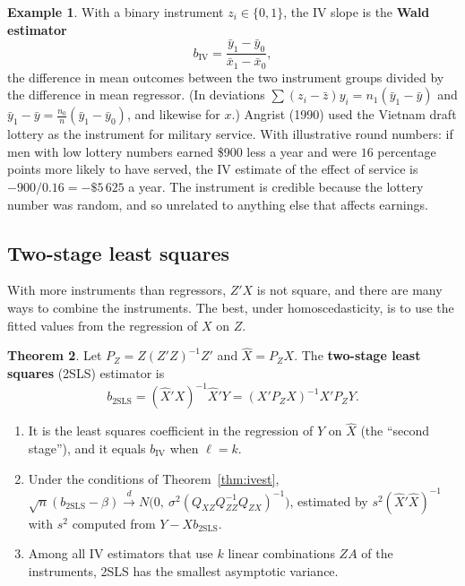 \documentclass[11pt,a4paper]{article}
\numberwithin{equation}{section}
\theoremstyle{definition}
\newtheorem{thm}{Theorem}[subsection]
\newtheorem{exa}[thm]{Example}
\begin{document}
\begin{exa}
\label{ex:wald}
With a binary instrument $z_i \in \{0, 1\}$, the IV slope is the \textbf{Wald estimator}
\[
b_{\text{IV}} = \frac{\bar y_1 - \bar y_0}{\bar x_1 - \bar x_0},
\]
the difference in mean outcomes between the two instrument groups divided by the difference in mean regressor. (In deviations
$\sum(z_i - \bar z)y_i = n_1(\bar y_1 - \bar y)$ and $\bar y_1 - \bar y = \frac{n_0}{n}(\bar y_1 - \bar y_0)$, and likewise for $x$.) Angrist (1990) used the Vietnam draft lottery as
the instrument for military service. With illustrative round numbers: if men with low lottery numbers earned \$900 less a year and were $16$ percentage points more likely to have
served, the IV estimate of the effect of service is $-900/0.16 = -\$5\,625$ a year. The instrument is credible because the lottery number was random,
and so unrelated to anything else that affects earnings.
\end{exa}

\subsection{Two-stage least squares}
\label{ssec:tsls}

With more instruments than regressors, $Z'X$ is not square, and there are many ways to combine the instruments. The best, under
homoscedasticity, is to use the fitted values from the regression of $X$ on $Z$.

\begin{thm}
\label{thm:tsls}
Let $P_Z = Z(Z'Z)^{-1}Z'$ and $\hat X = P_ZX$. The \textbf{two-stage least squares} (2SLS) estimator is
\[
b_{\text{2SLS}} = (\hat X'X)^{-1}\hat X'Y = (X'P_ZX)^{-1}X'P_ZY .
\]
\begin{enumerate}[label=(\roman*)]
\item It is the least squares coefficient in the regression of $Y$ on $\hat X$ (the ``second stage''), and it equals $b_{\text{IV}}$ when $\ell = k$.
\item Under the conditions of Theorem~\ref{thm:ivest}, $\sqrt n(b_{\text{2SLS}} - \beta) \xrightarrow{d} N\bigl(0,\ \sigma^2(Q_{XZ}Q_{ZZ}^{-1}Q_{ZX})^{-1}\bigr)$, estimated by $s^2(\hat X'\hat X)^{-1}$
with $s^2$ computed from $Y - Xb_{\text{2SLS}}$.
\item Among all IV estimators that use $k$ linear combinations $ZA$ of the instruments, 2SLS has the smallest asymptotic variance.
\end{enumerate}
\end{thm}
\end{document}
